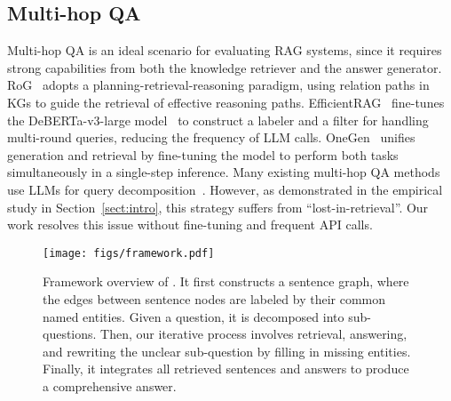 \subsection{Multi-hop QA}
Multi-hop QA is an ideal scenario for evaluating RAG systems, since it requires strong capabilities from both the knowledge retriever and the answer generator. 
RoG~\cite{RoG} adopts a planning-retrieval-reasoning paradigm, using relation paths in KGs to guide the retrieval of effective reasoning paths.
EfficientRAG~\cite{EfficientRag} fine-tunes the DeBERTa-v3-large model~\cite{Deberta} to construct a labeler and a filter for handling multi-round queries, reducing the frequency of LLM calls.
OneGen~\cite{ONEGen} unifies generation and retrieval by fine-tuning the model to perform both tasks simultaneously in a single-step inference. 
Many existing multi-hop QA methods use LLMs for query decomposition~\cite{ragsurvey}. 
However, as demonstrated in the empirical study in Section~\ref{sect:intro}, this strategy suffers from ``lost-in-retrieval''.
Our work resolves this issue without fine-tuning and frequent API calls.

\begin{figure*}[!t]
  \texttt{[image: figs/framework.pdf]}
  \caption{Framework overview of \modelname. 
  It first constructs a sentence graph, where the edges between sentence nodes are labeled by their common named entities.
  Given a question, it is decomposed into sub-questions. 
  Then, our iterative process involves retrieval, answering, and rewriting the unclear sub-question by filling in missing entities. 
  Finally, it integrates all retrieved sentences and answers to produce a comprehensive answer.}
  \label{fig:framework}
\end{figure*}